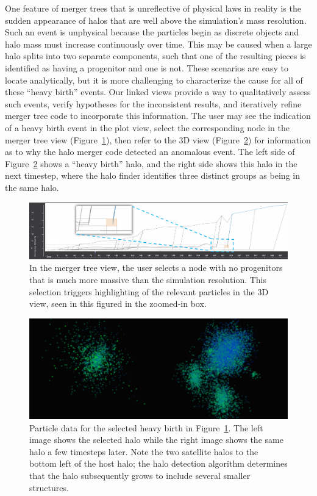 One feature of merger trees that is unreflective of physical laws in reality is the sudden appearance of halos that are well above the simulation's mass resolution. Such an event is unphysical because the particles begin as discrete objects and halo mass must increase continuously over time. This may be caused when a large halo splits into two separate components, such that one of the resulting pieces is identified as having a progenitor and one is not. These scenarios are easy to locate analytically, but it is more challenging to characterize the cause for all of these ``heavy birth'' events. Our linked views provide a way to qualitatively assess such events, verify hypotheses for the inconsistent results, and iteratively refine merger tree code to incorporate this information. The user may see the indication of a heavy birth event in the plot view, select the corresponding node in the merger tree view (Figure~\ref{fig:heavy_birth1}), then refer to the 3D view (Figure~\ref{fig:heavy_birth2}) for information as to why the halo merger code detected an anomalous event. The left side of Figure~\ref{fig:heavy_birth2} shows a ``heavy birth'' halo, and the right side shows this halo in the next timestep, where the halo finder identifies three distinct groups as being in the same halo.

	\begin{figure}[t]
		\includegraphics[width=\textwidth]{images/darkmatter/heavy_birth.png}
		\caption{In the merger tree view, the user selects a node with no progenitors that is much more massive than the simulation resolution. This selection triggers highlighting of the relevant particles in the 3D view, seen in this figured in the zoomed-in box.}
		\label{fig:heavy_birth1}
	\end{figure}

	\begin{figure}[t]
		\includegraphics[width=\textwidth]{images/darkmatter/hb_particles.png}
		\caption{Particle data for the selected heavy birth in Figure~\ref{fig:heavy_birth1}. The left image shows the selected halo while the right image shows the same halo a few timesteps later. Note the two satellite halos to the bottom left of the host halo; the halo detection algorithm determines that the halo subsequently grows to include several smaller structures.}
		\label{fig:heavy_birth2}
	\end{figure}

